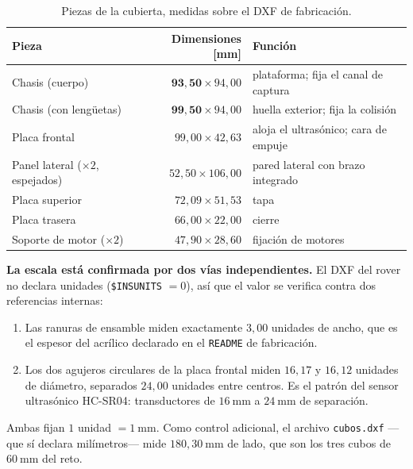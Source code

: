 \documentclass[11pt,a4paper]{article}
\theoremstyle{definition}
\begin{document}
\begin{table}[htbp]
\centering
\small
\caption{Piezas de la cubierta, medidas sobre el DXF de fabricación.}
\begin{tabular}{lrl}
\toprule
Pieza & Dimensiones [mm] & Función \\
\midrule
Chasis (cuerpo) & $\mathbf{93{,}50} \times 94{,}00$ & plataforma; fija el canal de captura \\
Chasis (con lengüetas) & $\mathbf{99{,}50} \times 94{,}00$ & huella exterior; fija la colisión \\
Placa frontal & $99{,}00 \times 42{,}63$ & aloja el ultrasónico; cara de empuje \\
Panel lateral (${\times}2$, espejados) & $52{,}50 \times 106{,}00$ & pared lateral con brazo integrado \\
Placa superior & $72{,}09 \times 51{,}53$ & tapa \\
Placa trasera & $66{,}00 \times 22{,}00$ & cierre \\
Soporte de motor (${\times}2$) & $47{,}90 \times 28{,}60$ & fijación de motores \\
\bottomrule
\end{tabular}
\label{tab:dxf}
\end{table}

\begin{tcolorbox}[colback=black!3,colframe=black!50,boxrule=0.5pt,arc=1pt]
\textbf{La escala está confirmada por dos vías independientes.} El DXF del rover no
declara unidades (\texttt{\$INSUNITS} $= 0$), así que el valor se verifica contra dos
referencias internas:
\begin{enumerate}[label=(\alph*),leftmargin=2em,itemsep=1pt,topsep=2pt]
\item Las ranuras de ensamble miden exactamente $3{,}00$ unidades de ancho, que es el
      espesor del acrílico declarado en el \texttt{README} de fabricación.
\item Los dos agujeros circulares de la placa frontal miden $16{,}17$ y $16{,}12$
      unidades de diámetro, separados $24{,}00$ unidades entre centros. Es el patrón
      del sensor ultrasónico HC-SR04: transductores de $16\ \mathrm{mm}$ a
      $24\ \mathrm{mm}$ de separación.
\end{enumerate}
Ambas fijan $1$ unidad $= 1\ \mathrm{mm}$. Como control adicional, el archivo
\texttt{cubos.dxf} ---que sí declara milímetros--- mide $180{,}30\ \mathrm{mm}$ de lado,
que son los tres cubos de $60\ \mathrm{mm}$ del reto.
\end{tcolorbox}
\end{document}
